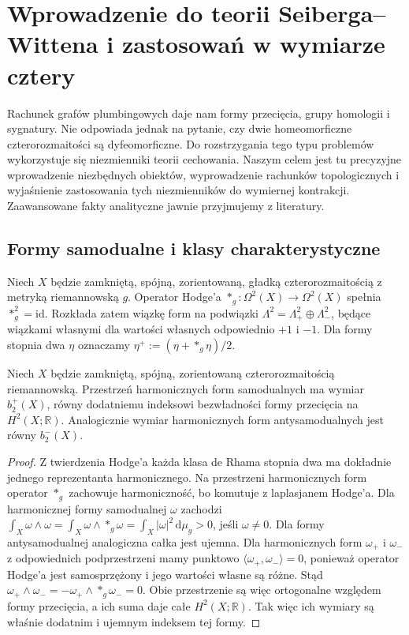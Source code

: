 \chapter{Wprowadzenie do teorii Seiberga--Wittena i zastosowań w wymiarze cztery}
\label{ch:tg-sw}

Rachunek grafów plumbingowych daje nam formy przecięcia,
grupy homologii i sygnatury. Nie odpowiada jednak na pytanie,
czy dwie homeomorficzne czterorozmaitości są dyfeomorficzne.
Do rozstrzygania tego typu problemów wykorzystuje się
niezmienniki teorii cechowania. Naszym celem jest tu
precyzyjne wprowadzenie niezbędnych obiektów, wyprowadzenie
rachunków topologicznych i wyjaśnienie zastosowania tych
niezmienników do wymiernej kontrakcji. Zaawansowane
fakty analityczne jawnie przyjmujemy z literatury.

\section{Formy samodualne i klasy charakterystyczne}
\label{sec:tg-sw-selfdual}

Niech $X$ będzie zamkniętą, spójną, zorientowaną,
gładką czterorozmaitością z metryką riemannowską $g$.
Operator Hodge'a $*_g:\Omega^2(X)\to\Omega^2(X)$ spełnia
$*_g^2=\mathrm{id}$. Rozkłada zatem wiązkę form na podwiązki
$\Lambda^2=\Lambda^2_+\oplus\Lambda^2_-$, będące wiązkami
własnymi dla wartości własnych odpowiednio $+1$ i $-1$.
Dla formy stopnia dwa $\eta$ oznaczamy
$\eta^+:=(\eta+*_g\eta)/2$.

\begin{stwierdzenie}
Niech $X$ będzie zamkniętą, spójną, zorientowaną
czterorozmaitością riemannowską. Przestrzeń harmonicznych
form samodualnych ma wymiar $b_2^+(X)$, równy dodatniemu
indeksowi bezwładności formy przecięcia na $H^2(X;\mathbb R)$.
Analogicznie wymiar harmonicznych form antysamodualnych
jest równy $b_2^-(X)$.
\end{stwierdzenie}

\begin{proof}
Z twierdzenia Hodge'a każda klasa de Rhama stopnia dwa
ma dokładnie jednego reprezentanta harmonicznego.
Na przestrzeni harmonicznych form operator $*_g$ zachowuje
harmoniczność, bo komutuje z laplasjanem Hodge'a.
Dla harmonicznej formy samodualnej $\omega$ zachodzi
$\int_X\omega\wedge\omega=\int_X\omega\wedge*_g\omega
=\int_X|\omega|^2\,\mathrm d\mu_g>0$, jeśli $\omega\ne0$.
Dla formy antysamodualnej analogiczna całka jest ujemna.
Dla harmonicznych form $\omega_+$ i $\omega_-$
z odpowiednich podprzestrzeni mamy punktowo
$\langle\omega_+,\omega_-\rangle=0$,
ponieważ operator Hodge'a jest samosprzężony
i jego wartości własne są różne.
Stąd $\omega_+\wedge\omega_-=
-\omega_+\wedge *_g\omega_-=0$.
Obie przestrzenie są więc ortogonalne względem
formy przecięcia, a ich suma daje całe $H^2(X;\mathbb R)$.
Tak więc ich wymiary są właśnie dodatnim i ujemnym
indeksem tej formy.
\end{proof}

